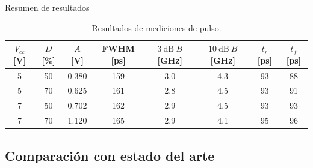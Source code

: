 \documentclass{beamer}
\begin{document}
\begin{frame}{Resumen de resultados}
    \begin{table}[t!]
    \centering
    {\tiny
    \begin{tabular}{cccccccc}
    \hline
        $V_{cc}$ [\unit{\volt}] & $D$ [\unit{\percent}] & $A$ [\unit{\volt}] & FWHM
        [\unit{\pico\second}] & $\qty{3}{\dB} \ B$ [\unit{\giga\hertz}] &
        $\qty{10}{\dB} \ B$ [\unit{\giga\hertz}] & $t_r$ [\unit{\pico\second}] &
        $t_f$ [\unit{\pico\second}]\\
    \hline
        5 & 50 & 0.380 & 159 & 3.0 & 4.3 & 93 & 88 \\
        5 & 70 & 0.625 & 161 & 2.8 & 4.5 & 93 & 91 \\
        7 & 50 & 0.702 & 162 & 2.9 & 4.5 & 93 & 93 \\
        7 & 70 & 1.120 & 165 & 2.9 & 4.1 & 95 & 96 \\
    \hline
    \end{tabular}
        }
    \caption{Resultados de mediciones de pulso.}
    \label{tab:mediciones_pulso_resultados}
    \end{table}
\end{frame}

\subsection{Comparación con estado del arte}
\end{document}
